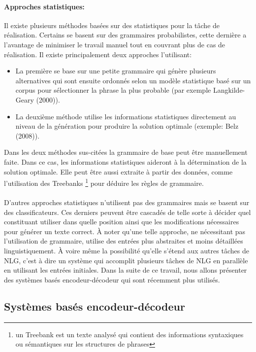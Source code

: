 \paragraph{Approches statistiques:} Il existe plusieurs méthodes basées sur des statistiques pour la tâche de réalisation. Certains se basent sur des grammaires probabilistes, cette dernière a l’avantage de minimiser le travail manuel tout en couvrant plus de cas de réalisation. Il existe principalement deux approches l’utilisant\cite{Gatt2018}:
\begin{itemize}
	\item La première se base sur une petite grammaire qui génère plusieurs alternatives qui sont ensuite ordonnés selon un modèle statistique basé sur un corpus pour sélectionner la phrase la plus probable (par exemple Langkilde-Geary (2000)\cite{LangkildeGeary2000}).
	\item La deuxième méthode utilise les informations statistiques directement au niveau de la génération pour produire la solution optimale (exemple: Belz (2008)\cite{Belz2008}).
\end{itemize}
	Dans les deux méthodes sus-citées la grammaire de base peut être manuellement faite. Dans ce cas, les informations statistiques aideront à la détermination de la solution optimale. Elle peut être aussi extraite à partir des données, comme l’utilisation des Treebanks \footnote{un Treebank est un texte analysé qui contient des informations syntaxiques ou sémantiques sur les structures de phrases} pour déduire les règles de grammaire\cite{Espinosa2008}.\newline
\paragraph{}
D’autres approches statistiques n’utilisent pas des grammaires mais se basent sur des classificateurs. Ces derniers peuvent être cascadés de telle sorte à décider quel constituant utiliser dans quelle position ainsi que les modifications nécessaires pour générer un texte correct. À noter qu’une telle approche, ne nécessitant pas l’utilisation de grammaire, utilise des entrées plus abstraites et moins détaillées linguistiquement. À voire même la possibilité qu'elle s’étend aux autres tâches de NLG, c’est à dire un système qui accomplit plusieurs tâches de NLG en parallèle en utilisant les entrées initiales. Dans la suite de ce travail, nous allons présenter des systèmes basés encodeur-décodeur qui sont récemment plus utilisés.

\subsection{Systèmes basés encodeur-décodeur}
